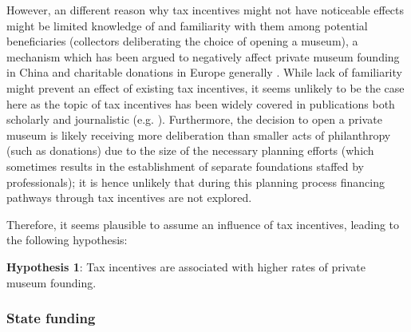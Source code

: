 \documentclass[11pt]{article}
\begin{document}
However, an different reason why tax incentives might not have noticeable effects might be limited knowledge of and familiarity with them among potential beneficiaries (collectors deliberating the choice of opening a museum), a mechanism which has been argued to negatively affect private museum founding in China \parencite[p.222]{DeNigris_2018_museums} and charitable donations in Europe generally \parencite{Hemels_2017_incentives}.
While lack of familiarity might prevent an effect of existing tax incentives, it seems unlikely to be the case here as the topic of tax incentives has been widely covered in publications both scholarly \parencite{Walker_2019_collector,Reich_2018_philantropy,Zorloni_Resch_2016_opportunities} and journalistic (e.g. \cite{Brown_Pes_2018_taxpayers,Boucher_2020_solow,Honig_2016_IRS}).
Furthermore, the decision to open a private museum is likely receiving more deliberation than smaller acts of philanthropy (such as donations) due to the size of the necessary planning efforts (which sometimes results in the establishment of separate foundations staffed by professionals); it is hence unlikely that during this planning process financing pathways through tax incentives are not explored.


Therefore, it seems plausible to assume an influence of tax incentives, leading to the following hypothesis:

\bigbreak
\noindent
\textbf{Hypothesis 1}: Tax incentives are associated with higher rates of private museum founding.




\subsubsection*{State funding}
\end{document}
